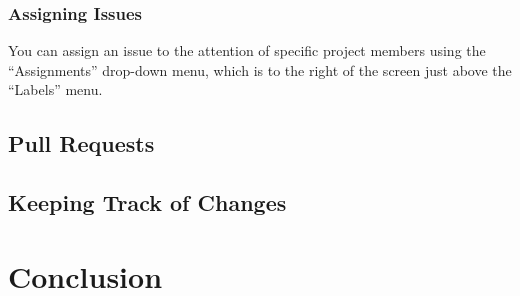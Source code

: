 \documentclass[11pt]{article}
\begin{document}
\subsubsection{Assigning Issues}

You can assign an issue to the attention of specific project members using the ``Assignments'' drop-down menu, which is to the right of the screen just above the ``Labels'' menu. 

\subsection{Pull Requests}

\subsection{Keeping Track of Changes}

\section{Conclusion}
\end{document}
